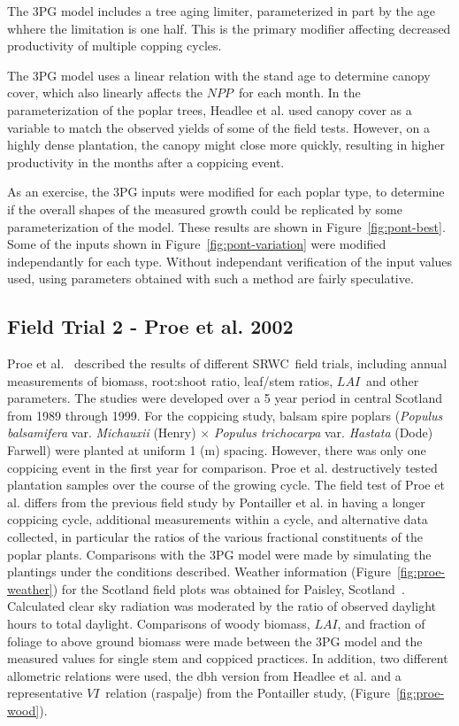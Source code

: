 \documentclass[10pt]{article}
\newcommand{\LAI}{\ensuremath{LAI}}
\newcommand{\NPP}{\ensuremath{NPP}}
\newcommand{\SRWC}{\textsc{SRWC}}
\newcommand{\VI}{\ensuremath{VI}}
\begin{document}
The 3PG model includes a tree aging limiter, parameterized in part by the age
whhere the limitation is one half.  This is the primary modifier affecting
decreased productivity of multiple copping cycles.

The 3PG model uses a linear relation with the stand age to determine canopy
cover, which also linearly affects the \NPP~for each month. In the
parameterization of the poplar trees, Headlee et al.\cite{Headlee2012} used
canopy cover as a variable to match the observed yields of some of the field
tests. However, on a highly dense plantation, the canopy might close more
quickly, resulting in higher productivity in the months after a coppicing event.

As an exercise, the 3PG inputs were modified for each poplar type, to determine
if the overall shapes of the measured growth could be replicated by some
parameterization of the model.  These results are shown in
Figure~\ref{fig:pont-best}.  Some of the inputs shown in
Figure~\ref{fig:pont-variation} were modified independantly for each
type. Without independant verification of the input values used, using
parameters obtained with such a method are fairly speculative.

\subsection*{Field Trial 2 - Proe et al. 2002}

Proe et al.~\cite{Proe2002} described the results of different \SRWC~field
trials, including annual measurements of biomass, root:shoot ratio, leaf/stem
ratios, \LAI~and other parameters. The studies were developed over a 5 year
period in central Scotland from 1989 through 1999. For the coppicing study,
balsam spire poplars (\textit{Populus balsamifera} var. \textit{Michauxii}
(Henry) $\times$ \textit{Populus trichocarpa} var. \textit{Hastata} (Dode)
Farwell) were planted at uniform 1 (m) spacing.  However, there was only one
coppicing event in the first year for comparison. Proe et al. destructively
tested plantation samples over the course of the growing cycle.  The field test
of Proe et al. differs from the previous field study by Pontailler et al. in
having a longer coppicing cycle, additional measurements within a cycle, and
alternative data collected, in particular the ratios of the various fractional
constituents of the poplar plants.  Comparisons with the 3PG model were made by
simulating the plantings under the conditions described. Weather information
(Figure~\ref{fig:proe-weather}) for the Scotland field plots was obtained for
Paisley, Scotland~\cite{Proe2002,MetOffice2013}. Calculated clear sky radiation
was moderated by the ratio of observed daylight hours to total
daylight. Comparisons of woody biomass, \LAI, and fraction of foliage to above
ground biomass were made between the 3PG model and the measured values for
single stem and coppiced practices.  In addition, two different allometric
relations were used, the dbh version from Headlee et al.\cite{Headlee2012} and a
representative \VI~relation (raspalje) from the Pontailler study,
(Figure~\ref{fig:proe-wood}). 
\end{document}
